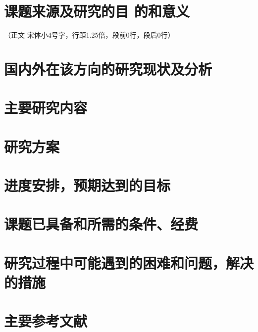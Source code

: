 \section{课题来源及研究的目	的和意义}
（正文  宋体小4号字，行距1.25倍，段前0行，段后0行）
\section{国内外在该方向的研究现状及分析}
\section{主要研究内容}
\section{研究方案}
\section{进度安排，预期达到的目标}
\section{课题已具备和所需的条件、经费}
\section{研究过程中可能遇到的困难和问题，解决的措施}
\section{主要参考文献}




